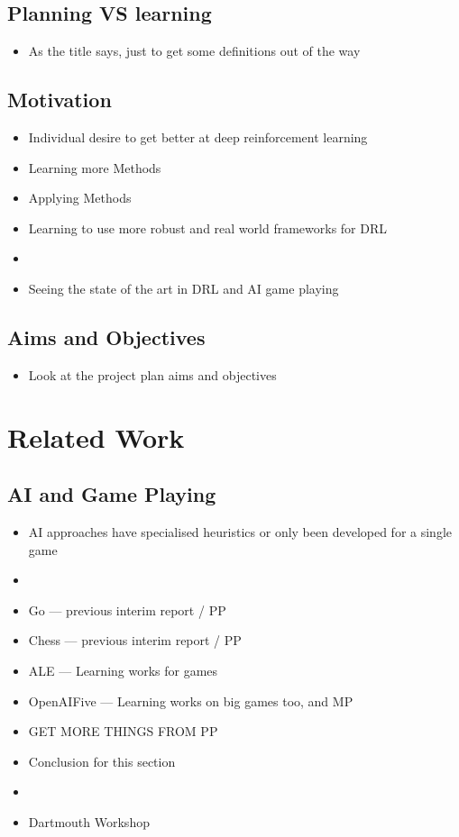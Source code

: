 \documentclass[a4paper]{article}
\begin{document}
\subsection{Planning VS learning}
\begin{itemize}
    \item As the title says, just to get some definitions out of the way
\end{itemize}
\subsection{Motivation}
\begin{itemize}
    \item Individual desire to get better at deep reinforcement learning
    \item Learning more Methods
    \item Applying Methods
    \item Learning to use more robust and real world frameworks for DRL
    \item
    \item Seeing the state of the art in DRL and AI game playing
\end{itemize}
\subsection{Aims and Objectives}
\begin{itemize}
    \item Look at the project plan aims and objectives
\end{itemize}

\section{Related Work}
\subsection{AI and Game Playing}
\begin{itemize}
    \item AI approaches have specialised heuristics or only been developed for a single game
    \item
    \item Go --- previous interim report / PP
    \item Chess --- previous interim report / PP
    \item ALE --- Learning works for games
    \item OpenAIFive --- Learning works on big games too, and MP
    \item GET MORE THINGS FROM PP
    \item Conclusion for this section
    \item
    \item Dartmouth Workshop
\end{itemize}
\end{document}
